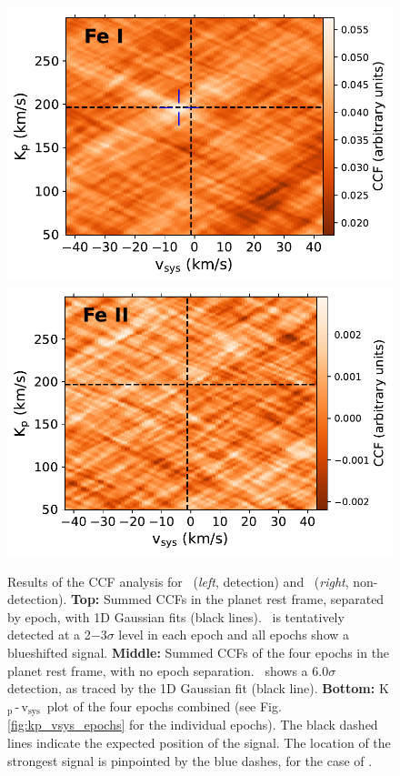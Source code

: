 \documentclass{aa}
\newcommand{\feI}{\ion{Fe}{i}}
\newcommand{\feII}{\ion{Fe}{ii}}
\newcommand{\kpvsys}{K$_\mathrm{p}$\,-\,v$_\mathrm{sys}$}
\begin{document}
\begin{figure}[h!]
    \includegraphics[width=0.49\hsize]{plots_submission2/W76b_Fe_kp_vsys4timeseries.pdf}
    \includegraphics[width=0.49\hsize]{plots_submission2/W76b_FePlus_kp_vsys4timeseries.pdf}
    \caption{Results of the CCF analysis for \feI\ (\textit{left}, detection) and \feII\ (\textit{right}, non-detection). \textbf{Top:} Summed CCFs in the planet rest frame, separated by epoch, with 1D Gaussian fits (black lines). \feI\ is tentatively detected at a 2$-$3$\sigma$ level in each epoch and all epochs show a blueshifted signal. \textbf{Middle:} Summed CCFs of the four epochs in the planet rest frame, with no epoch separation. \feI\ shows a 6.0$\sigma$ detection, as traced by the 1D Gaussian fit (black line). \textbf{Bottom:} \kpvsys\ plot of the four epochs combined (see Fig. \ref{fig:kp_vsys_epochs} for the individual epochs). The black dashed lines indicate the expected position of the signal. The location of the strongest signal is pinpointed by the blue dashes, for the case of \feI.}
    \label{fig:ccf}
\end{figure}
\end{document}
